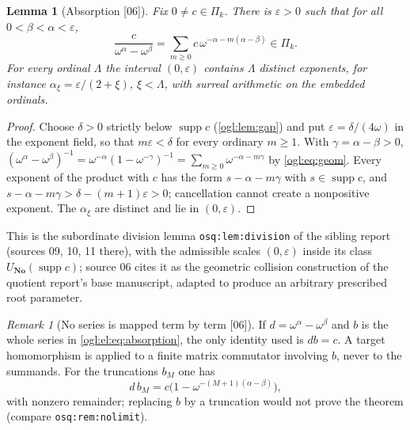 \documentclass[11pt,oneside]{article}
\numberwithin{equation}{section}
\newtheorem{lemma}[lemma]{Lemma}
\theoremstyle{definition}
\theoremstyle{remark}
\newtheorem{remark}[remark]{Remark}
\newcommand{\No}{\mathbf{No}}
\newcommand{\supp}{\operatorname{supp}}
\newcommand{\src}[1]{\textup{\textsf{\small[#1]}}}
\newcommand{\replabel}[1]{\nolinkurl{#1}}
\begin{document}
\begin{lemma}[Absorption \src{06}]\label{ogl:el:lem:absorb}
Fix $0\ne c\in\Pi_k$. There is $\varepsilon>0$ such that for all
$0<\beta<\alpha<\varepsilon$,
\begin{equation}\label{ogl:el:eq:absorption}
 \frac{c}{\omega^\alpha-\omega^\beta}
 =\sum_{m\ge0}c\,\omega^{-\alpha-m(\alpha-\beta)}\in\Pi_k .
\end{equation}
For every ordinal $\Lambda$ the interval $(0,\varepsilon)$ contains $\Lambda$
distinct exponents, for instance $\alpha_\xi=\varepsilon/(2+\xi)$, $\xi<\Lambda$,
with surreal arithmetic on the embedded ordinals.
\end{lemma}
\begin{proof}
Choose $\delta>0$ strictly below $\supp c$ (\cref{ogl:lem:gap}) and put
$\varepsilon=\delta/(4\omega)$ in the exponent field, so that $m\varepsilon<\delta$
for every ordinary $m\ge1$. With $\gamma=\alpha-\beta>0$,
$(\omega^\alpha-\omega^\beta)^{-1}=\omega^{-\alpha}(1-\omega^{-\gamma})^{-1}
=\sum_{m\ge0}\omega^{-\alpha-m\gamma}$ by \eqref{ogl:eq:geom}. Every exponent of
the product with $c$ has the form $s-\alpha-m\gamma$ with $s\in\supp c$, and
$s-\alpha-m\gamma>\delta-(m+1)\varepsilon>0$; cancellation cannot create a
nonpositive exponent. The $\alpha_\xi$ are distinct and lie in $(0,\varepsilon)$.
\end{proof}

This is the subordinate division lemma \replabel{osq:lem:division} of the
sibling report (sources 09, 10, 11 there), with the admissible scales
$(0,\varepsilon)$ inside its class $U_{\No}(\supp c)$; source 06 cites it as the
geometric collision construction of the quotient report's base manuscript,
adapted to produce an arbitrary prescribed root parameter.

\begin{remark}[No series is mapped term by term \src{06}]\label{ogl:el:rem:nomapseries}
If $d=\omega^\alpha-\omega^\beta$ and $b$ is the whole series in
\eqref{ogl:el:eq:absorption}, the only identity used is $db=c$. A target
homomorphism is applied to a finite matrix commutator involving $b$, never to
the summands. For the truncations $b_M$ one has
\begin{equation}\label{ogl:el:eq:remainder}
 d\,b_M=c\bigl(1-\omega^{-(M+1)(\alpha-\beta)}\bigr),
\end{equation}
with nonzero remainder; replacing $b$ by a truncation would not prove the
theorem (compare \replabel{osq:rem:nolimit}).
\end{remark}
\end{document}
